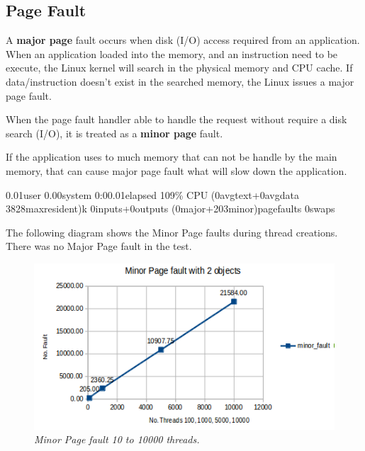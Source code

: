 \documentclass[12pt]{article}
\begin{document}
\subsection{Page Fault}
A \textbf{major page} fault occurs when disk (I/O) access required from an application. When an application loaded into the memory, and an instruction need to be execute, the Linux kernel will search in the physical memory and CPU cache. If data/instruction doesn't exist in the searched memory, the Linux issues a major page fault.\\
\begin{flushleft}
When the page fault handler able to handle the request without require a disk search (I/O), it is treated as a \textbf{minor page} fault.
\end{flushleft}
\begin{flushleft}
If the application uses to much memory that can not be handle by the main memory, that can cause major page fault what will slow down the application.
\end{flushleft}

\begin{flushleft}
0.01user 0.00system 0:00.01elapsed 109\% CPU (0avgtext+0avgdata 3828maxresident)k
0inputs+0outputs (0major+203minor)pagefaults 0swaps
\end{flushleft}

\begin{flushleft}
The following diagram shows the Minor Page faults during thread creations. There was no Major Page fault in the test.
\end{flushleft}

\begin{figure}[h!]
\centering
\includegraphics[scale=0.6]{Pictures/minor_fault.png}
\caption*{\textit{\color{gray}Minor Page fault 10 to 10000 threads.}}
\end{figure}
\end{document}

